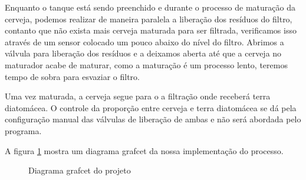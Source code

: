 \documentclass[twoside,twocolumn, 12pt]{paper}
\begin{document}
	Enquanto o  tanque está sendo preenchido e durante o processo de maturação da cerveja, podemos realizar de maneira paralela a liberação dos resíduos do filtro, contanto que não exista mais cerveja maturada para ser filtrada, verificamos isso através de um sensor colocado um pouco abaixo do nível do filtro. Abrimos a válvula para liberação dos resíduos e a deixamos aberta até que a cerveja no maturador acabe de maturar, como a maturação é um processo lento, teremos tempo de sobra para esvaziar o filtro.
	
	Uma vez maturada, a cerveja segue para o a filtração onde receberá terra diatomácea. O controle da proporção entre cerveja e terra diatomácea se dá pela configuração manual das válvulas de liberação de ambas e não será abordada pelo programa.
	
	A figura \ref{fig:grafcet} mostra um diagrama grafcet da nossa implementação do processo.
	
	\begin{figure}[t]
		\centering
		\caption{Diagrama grafcet do projeto}
		\label{fig:grafcet}
	\end{figure}
	
\end{document}
